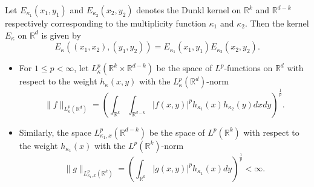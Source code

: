 \documentclass[a4paper,11pt, reqno]{amsart}
\theoremstyle{definition}
\theoremstyle{remark}
\numberwithin{equation}{section}
\begin{document}
	
	Let $E_{\kappa_1}(x_1, y_1)$ and $E_{\kappa_2}(x_2, y_2)$  denotes  the Dunkl kernel   on $\mathbb{R}^k$ and $\mathbb{R}^{d-k}$ respectively corresponding to the multiplicity function $\kappa_1$ and $\kappa_2$.  Then  the kernel $E_{\kappa}$ on    $\mathbb{R}^{d}$ is given by $$E_{\kappa}\left(\left(x_1, x_2 \right),\left(y_1, y_2 \right)\right)=E_{\kappa_1}\left(x_1, y_1\right) E_{\kappa_2}\left(x_2, y_2\right).$$
	\begin{itemize}
		\item 	For $1\leq p<\infty$, let $L_\kappa^p\left(\mathbb{R}^{k}\times \mathbb{R}^{d-k}\right)$ be the space of $L^p$-functions on $\mathbb{R}^{d}$ with respect to the weight $h_{\kappa}(x,y)$ with the $L_\kappa^p\left(\mathbb{R}^{d}\right)$-norm
		\begin{equation*}
			\|f\|_{L_\kappa^p\left(\mathbb{R}^{d}\right)}=\left(\int_{\mathbb{R}^{k}} \int_{\mathbb{R}^{d-k}}|f(x,y)|^p h_{\kappa_1}(x) h_{\kappa_2}(y)dx  dy\right)^\frac{1}{p}.
		\end{equation*}
		\item 	Similarly, the space  $L_{\kappa_1, x}^p\left(\mathbb{R}^{d-k}\right)$ be the space of $L^p(\mathbb{R}^{k})$ with respect to the weight $h_{\kappa_1}(x)$ with the $L^p(\mathbb{R}^{k})$-norm
		\begin{equation*}
			\|g\|_{L_{\kappa_1, x}^p\left(\mathbb{R}^{k}\right)}=\left(\int_{\mathbb{R}^{k}}|g(x,y)|^p  h_{\kappa_1}(x)  dy\right)^\frac{1}{p}<\infty.
		\end{equation*}
		

\end{itemize}
\end{document}
